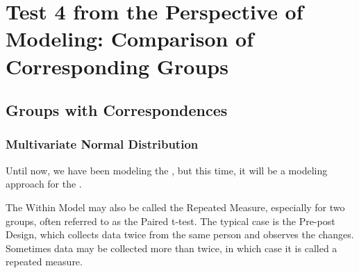 \documentclass{ltjsbook}
\begin{document}
\VerbatimFootnotes
\chapter{Test 4 from the Perspective of Modeling: Comparison of Corresponding Groups}
\label{x22_modeling4}
\section{Groups with Correspondences}
\subsection{Multivariate Normal Distribution}
Until now, we have been modeling the , but this time, it will be a modeling approach for the .

The Within Model may also be called the Repeated Measure, especially for two groups, often referred to as the Paired t-test. The typical case is the Pre-post Design, which collects data twice from the same person and observes the changes. Sometimes data may be collected more than twice, in which case it is called a repeated measure.
\end{document}
